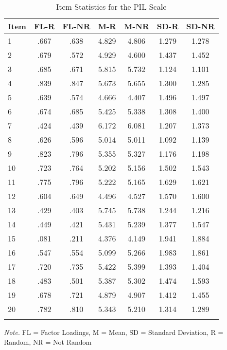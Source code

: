 \documentclass[english,man]{apa6}
\theoremstyle{definition}
\theoremstyle{definition}
\theoremstyle{definition}
\theoremstyle{remark}
\begin{document}
\begin{table}[tbp]
\begin{center}
\begin{threeparttable}
\caption{\label{tab:Ptable}Item Statistics for the PIL Scale}
\begin{tabular}{lcccccc}
\toprule
Item & \multicolumn{1}{c}{FL-R} & \multicolumn{1}{c}{FL-NR} & \multicolumn{1}{c}{M-R} & \multicolumn{1}{c}{M-NR} & \multicolumn{1}{c}{SD-R} & \multicolumn{1}{c}{SD-NR}\\
\midrule
1 & .667 & .638 & 4.829 & 4.806 & 1.279 & 1.278\\
2 & .679 & .572 & 4.929 & 4.600 & 1.437 & 1.452\\
3 & .685 & .671 & 5.815 & 5.732 & 1.124 & 1.101\\
4 & .839 & .847 & 5.673 & 5.655 & 1.300 & 1.285\\
5 & .639 & .574 & 4.666 & 4.407 & 1.496 & 1.497\\
6 & .674 & .685 & 5.425 & 5.338 & 1.308 & 1.400\\
7 & .424 & .439 & 6.172 & 6.081 & 1.207 & 1.373\\
8 & .626 & .596 & 5.014 & 5.011 & 1.092 & 1.139\\
9 & .823 & .796 & 5.355 & 5.327 & 1.176 & 1.198\\
10 & .723 & .764 & 5.202 & 5.156 & 1.502 & 1.543\\
11 & .775 & .796 & 5.222 & 5.165 & 1.629 & 1.621\\
12 & .604 & .649 & 4.496 & 4.527 & 1.570 & 1.600\\
13 & .429 & .403 & 5.745 & 5.738 & 1.244 & 1.216\\
14 & .449 & .421 & 5.431 & 5.239 & 1.377 & 1.547\\
15 & .081 & .211 & 4.376 & 4.149 & 1.941 & 1.884\\
16 & .547 & .554 & 5.099 & 5.266 & 1.983 & 1.861\\
17 & .720 & .735 & 5.422 & 5.399 & 1.393 & 1.404\\
18 & .483 & .501 & 5.387 & 5.302 & 1.474 & 1.593\\
19 & .678 & .721 & 4.879 & 4.907 & 1.412 & 1.455\\
20 & .782 & .810 & 5.343 & 5.210 & 1.314 & 1.289\\
\bottomrule
\addlinespace
\end{tabular}
\begin{tablenotes}[para]
\textit{Note.} FL = Factor Loadings, M = Mean, SD = Standard Deviation, R = Random, NR = Not Random
\end{tablenotes}
\end{threeparttable}
\end{center}
\end{table}
\end{document}

